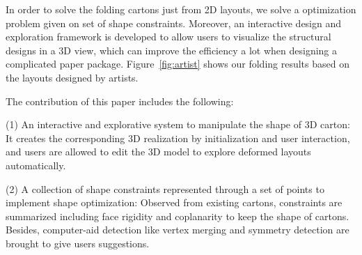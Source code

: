 


%
 
 
In order to solve the folding cartons just from 2D layouts, we solve a optimization problem given on  set of shape constraints.
Moreover, an interactive design and exploration framework is developed to allow users to visualize the structural designs in a 3D view, which can improve the efficiency a lot when designing a complicated paper package. Figure~\ref{fig:artist} shows our folding results based on the layouts designed by artists. 

The contribution of this paper includes the following:

(1) An interactive and explorative system to manipulate the shape of 3D carton: It creates the corresponding 3D realization by initialization and user interaction, and users are allowed to edit the 3D model to explore deformed layouts automatically.

(2) A collection of shape constraints represented through a set of points to implement shape optimization: Observed from existing cartons, constraints are summarized including face rigidity and coplanarity to keep the shape of cartons. Besides, computer-aid detection like vertex merging and symmetry detection are brought to give users suggestions. 